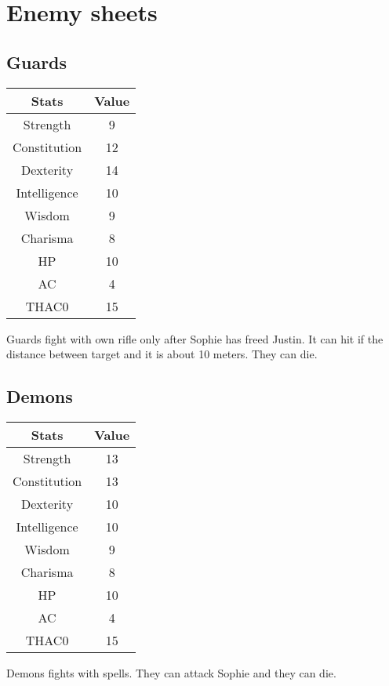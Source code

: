 \section{Enemy sheets}
\subsection{Guards}
\begin{table}[H]
\begin{tabular}{|c|c|}
\hline
\rowcolor[HTML]{C0C0C0} 
\textbf{Stats} & \textbf{Value} \\ \hline
Strength & 9 \\ \hline
Constitution & 12 \\ \hline
Dexterity & 14 \\ \hline
Intelligence & 10 \\ \hline
Wisdom & 9 \\ \hline
Charisma & 8 \\ \hline
HP & 10 \\ \hline
AC & 4 \\ \hline
THAC0 & 15 \\ \hline
\end{tabular}
\end{table}
Guards fight with own rifle only after Sophie has freed Justin. It can hit if the distance between target and it is about 10 meters. They can die. 
\subsection{Demons}
\begin{table}[H]
\begin{tabular}{|c|c|}
\hline
\rowcolor[HTML]{C0C0C0} 
\textbf{Stats} & \textbf{Value} \\ \hline
Strength & 13 \\ \hline
Constitution & 13 \\ \hline
Dexterity & 10 \\ \hline
Intelligence & 10 \\ \hline
Wisdom & 9 \\ \hline
Charisma & 8 \\ \hline
HP & 10 \\ \hline
AC & 4 \\ \hline
THAC0 & 15 \\ \hline
\end{tabular}
\end{table}
Demons fights with spells. They can attack Sophie and they can die. 

